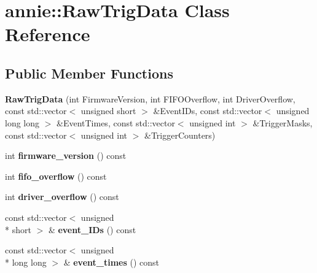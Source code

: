 \hypertarget{classannie_1_1RawTrigData}{\section{annie\-:\-:Raw\-Trig\-Data Class Reference}
\label{classannie_1_1RawTrigData}
}
\subsection*{Public Member Functions}
\begin{DoxyCompactItemize}
\item 
\hypertarget{classannie_1_1RawTrigData_a6ae63fa2f8b93d4b2316e44f916514ff}{{\bfseries Raw\-Trig\-Data} (int Firmware\-Version, int F\-I\-F\-O\-Overflow, int Driver\-Overflow, const std\-::vector$<$ unsigned short $>$ \&Event\-I\-Ds, const std\-::vector$<$ unsigned long long $>$ \&Event\-Times, const std\-::vector$<$ unsigned int $>$ \&Trigger\-Masks, const std\-::vector$<$ unsigned int $>$ \&Trigger\-Counters)}\label{classannie_1_1RawTrigData_a6ae63fa2f8b93d4b2316e44f916514ff}

\item 
\hypertarget{classannie_1_1RawTrigData_ae2a61506788dbdca9257979834e31864}{int {\bfseries firmware\-\_\-version} () const }\label{classannie_1_1RawTrigData_ae2a61506788dbdca9257979834e31864}

\item 
\hypertarget{classannie_1_1RawTrigData_a9049967c57b01c7c189b994ecb687ccf}{int {\bfseries fifo\-\_\-overflow} () const }\label{classannie_1_1RawTrigData_a9049967c57b01c7c189b994ecb687ccf}

\item 
\hypertarget{classannie_1_1RawTrigData_a83c9eb98baa8604cda1efbbbc70fcf30}{int {\bfseries driver\-\_\-overflow} () const }\label{classannie_1_1RawTrigData_a83c9eb98baa8604cda1efbbbc70fcf30}

\item 
\hypertarget{classannie_1_1RawTrigData_ae44ed716fb766936d37cc71245ad1b97}{const std\-::vector$<$ unsigned \\*
short $>$ \& {\bfseries event\-\_\-\-I\-Ds} () const }\label{classannie_1_1RawTrigData_ae44ed716fb766936d37cc71245ad1b97}

\item 
\hypertarget{classannie_1_1RawTrigData_aaebd7b36ac26b831389af068e5298404}{const std\-::vector$<$ unsigned \\*
long long $>$ \& {\bfseries event\-\_\-times} () const }\label{classannie_1_1RawTrigData_aaebd7b36ac26b831389af068e5298404}


\end{DoxyCompactItemize}
